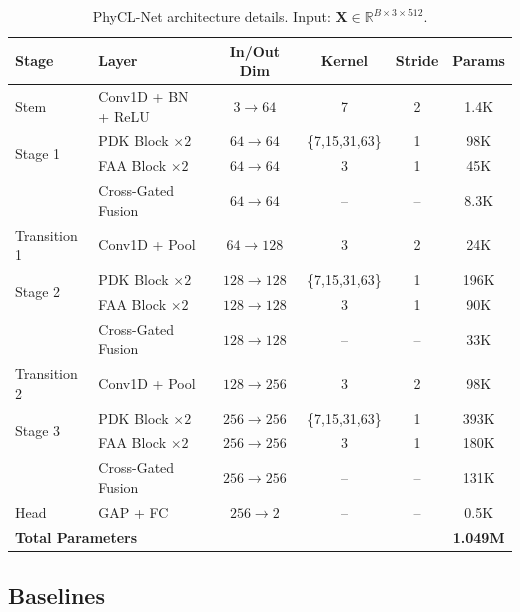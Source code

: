 \documentclass{article}
\begin{document}
\begin{table}[htbp]
\caption{PhyCL-Net architecture details. Input: $\mathbf{X} \in \mathbb{R}^{B \times 3 \times 512}$.}
\label{tab:architecture}
\centering
\small
\begin{tabular}{llcccc}
\toprule
\textbf{Stage} & \textbf{Layer} & \textbf{In/Out Dim} & \textbf{Kernel} & \textbf{Stride} & \textbf{Params} \\
\midrule
Stem & Conv1D + BN + ReLU & $3 \to 64$ & 7 & 2 & 1.4K \\
\midrule
\multirow{2}{*}{Stage 1} & PDK Block $\times 2$ & $64 \to 64$ & \{7,15,31,63\} & 1 & 98K \\
 & FAA Block $\times 2$ & $64 \to 64$ & 3 & 1 & 45K \\
 & Cross-Gated Fusion & $64 \to 64$ & -- & -- & 8.3K \\
\midrule
Transition 1 & Conv1D + Pool & $64 \to 128$ & 3 & 2 & 24K \\
\midrule
\multirow{2}{*}{Stage 2} & PDK Block $\times 2$ & $128 \to 128$ & \{7,15,31,63\} & 1 & 196K \\
 & FAA Block $\times 2$ & $128 \to 128$ & 3 & 1 & 90K \\
 & Cross-Gated Fusion & $128 \to 128$ & -- & -- & 33K \\
\midrule
Transition 2 & Conv1D + Pool & $128 \to 256$ & 3 & 2 & 98K \\
\midrule
\multirow{2}{*}{Stage 3} & PDK Block $\times 2$ & $256 \to 256$ & \{7,15,31,63\} & 1 & 393K \\
 & FAA Block $\times 2$ & $256 \to 256$ & 3 & 1 & 180K \\
 & Cross-Gated Fusion & $256 \to 256$ & -- & -- & 131K \\
\midrule
Head & GAP + FC & $256 \to 2$ & -- & -- & 0.5K \\
\midrule
\multicolumn{5}{l}{\textbf{Total Parameters}} & \textbf{1.049M} \\
\bottomrule
\end{tabular}
\end{table}

\subsection{Baselines}
\end{document}
